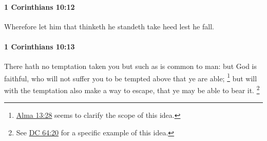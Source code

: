 		\paragraph{1 Corinthians 10:12} %
			\label{1CORINTHIANS-10-12}

			Wherefore let him that thinketh he standeth take heed lest he fall.

			\begin{framed}
				\scriptsize
				\begin{compactdesc}
					\item[SBLG] 
				\end{compactdesc}
			\end{framed}

		\paragraph{1 Corinthians 10:13} %
			\label{1CORINTHIANS-10-13}

			There hath no temptation taken you but such as is common to man: but God is faithful, who will not suffer you to be tempted above that ye are able;%
				\footnote{%
					\hyperref[ALMA-13-28]{Alma 13:28} seems to clarify the scope of this idea.
					}
			but will with the temptation also make a way to escape, that ye may be able to bear it.%
				\footnote{%
					See \hyperref[DC64-20]{DC 64:20} for a specific example of this idea. 
					}

